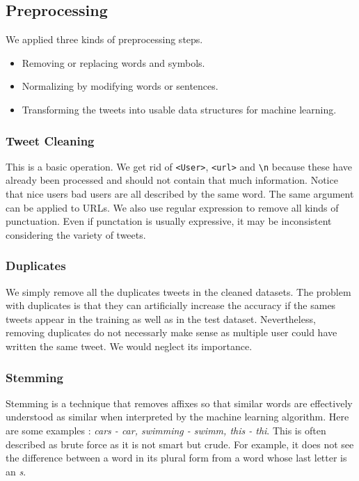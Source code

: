 \documentclass[11pt, a4paper, twocolumn]{article}
\begin{document}
\subsection{Preprocessing}
We applied three kinds of preprocessing steps.
\begin{itemize}
	\setlength\itemsep{1px}
	\item Removing or replacing words and symbols.
	\item Normalizing by modifying words or sentences.
	\item Transforming the tweets into usable data structures for machine learning.
\end{itemize}

\subsubsection{Tweet Cleaning}
This is a basic operation. We get rid of \texttt{<User>}, \texttt{<url>} and \verb"\n" because these have already been processed and should not contain that much information. Notice that nice users bad users are all described by the same word. The same argument can be applied to URLs. We also use regular expression to remove all kinds of punctuation. Even if punctation is usually expressive, it may be inconsistent considering the variety of tweets.

\subsubsection{Duplicates}
We simply remove all the duplicates tweets in the cleaned datasets. The problem with duplicates is that they can artificially increase the accuracy if the sames tweets appear in the training as well as in the test dataset. Nevertheless, removing duplicates do not necessarly make sense as multiple user could have written the same tweet. We would neglect its importance.

\subsubsection{Stemming}
Stemming is a technique that removes affixes so that similar words are effectively understood as similar when interpreted by the machine learning algorithm. Here are some examples : \textit{cars - car, swimming - swimm, this - thi}. This is often described as brute force as it is not smart but crude. For example, it does not see the difference between a word in its plural form from a word whose last letter is an \textit{s}.
\end{document}
